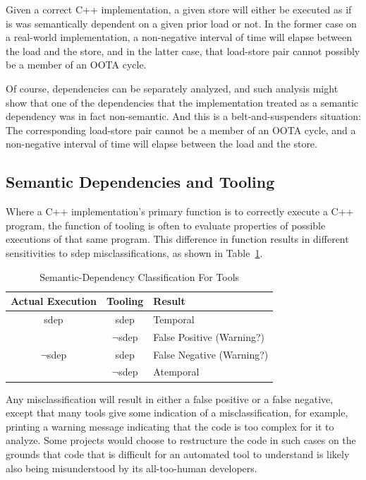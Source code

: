 \documentclass[10]{article}
\begin{document}
Given a correct C++ implementation, a given store will either be
executed as if is was semantically dependent on a given prior load or
not.
In the former case on a real-world implementation, a non-negative interval
of time will elapse between the load and the store, and in the latter
case, that load-store pair cannot possibly be a member of an OOTA cycle.

Of course, dependencies can be separately analyzed, and such analysis
might show that one of the dependencies that the implementation treated
as a semantic dependency was in fact non-semantic.
And this is a belt-and-suspenders situation:
The corresponding load-store pair cannot be a member of an OOTA cycle,
and a non-negative interval of time will elapse between the load and
the store.

\subsection{Semantic Dependencies and Tooling}
\label{sec:Semantic Dependencies and Tooling}

Where a C++ implementation's primary function is to correctly execute
a C++ program, the function of tooling is often to evaluate properties
of possible executions of that same program.
This difference in function results in different sensitivities to
sdep misclassifications, as shown in
Table~\ref{tab:Semantic-Dependency Classification For Tools}.

\begin{table}
\centering
\begin{tabular}{c|c|l}
Actual Execution	& Tooling		& Result \\
\hline
sdep			& sdep			& Temporal \\
\cline{2-3}
			& $\neg$sdep		& False Positive (Warning?) \\
\hline
$\neg$sdep		& sdep			& False Negative (Warning?) \\
\cline{2-3}
			& $\neg$sdep		& Atemporal \\
\end{tabular}
\caption{Semantic-Dependency Classification For Tools}
\label{tab:Semantic-Dependency Classification For Tools}
\end{table}

Any misclassification will result in either a false positive or
a false negative, except that many tools give some indication of a
misclassification, for example, printing a warning message indicating
that the code is too complex for it to analyze.
Some projects would choose to restructure the code in such cases on the
grounds that code that is difficult for an automated tool to understand
is likely also being misunderstood by its all-too-human developers.
\end{document}
